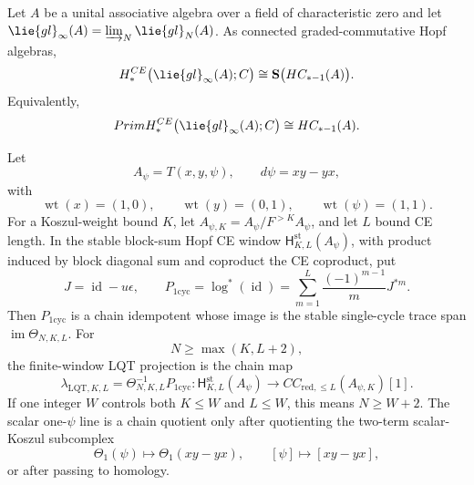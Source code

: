 \documentclass[11pt]{memoir}
\begin{document}
\begin{thm}
  Let \(A\) be a unital associative algebra over a field of characteristic
  zero and let
  \(\lie{gl}_\infty(A)=\varinjlim_N\lie{gl}_N(A)\).  As connected
  graded-commutative Hopf algebras,
  \[
    H_*^{\mathrm{CE}}\bigl(\lie{gl}_{\infty}(A);\C\bigr)
    \cong \mathbf S\bigl(HC_{*-1}(A)\bigr).
  \]
  Equivalently,
  \[
    \operatorname{Prim}H_*^{\mathrm{CE}}
      \bigl(\lie{gl}_\infty(A);\C\bigr)
    \cong HC_{*-1}(A).
  \]
\end{thm}
\begin{thm}\label{thm:stable-eulerian-lqt-window}
  Let
  \[
    A_\psi=T(x,y,\psi),\qquad d\psi=xy-yx,
  \]
  with
  \[
    \operatorname{wt}(x)=(1,0),\qquad
    \operatorname{wt}(y)=(0,1),\qquad
    \operatorname{wt}(\psi)=(1,1).
  \]
  For a Koszul-weight bound \(K\), let
  \(A_{\psi,K}=A_\psi/F^{>K}A_\psi\), and let \(L\) bound CE length.
  In the stable block-sum Hopf CE window
  \(\mathsf H^{\mathrm{st}}_{K,L}(A_\psi)\), with product induced by
  block diagonal sum and coproduct the CE coproduct, put
  \[
    J=\operatorname{id}-u\epsilon,\qquad
    P_{1\mathrm{cyc}}
    =
    \log^*(\operatorname{id})
    =
    \sum_{m=1}^{L}\frac{(-1)^{m-1}}{m}J^{*m}.
  \]
  Then \(P_{1\mathrm{cyc}}\) is a chain idempotent whose image is the
  stable single-cycle trace span
  \(\operatorname{im}\Theta_{N,K,L}\).  For
  \[
    N\geq\max(K,L+2),
  \]
  the finite-window LQT projection is the chain map
  \[
    \lambda_{\mathrm{LQT},K,L}
    =
    \Theta_{N,K,L}^{-1}P_{1\mathrm{cyc}}
    \colon
    \mathsf H^{\mathrm{st}}_{K,L}(A_\psi)
    \longrightarrow
    CC_{\mathrm{red},\leq L}(A_{\psi,K})[1].
  \]
  If one integer \(W\) controls both \(K\leq W\) and \(L\leq W\), this
  means \(N\geq W+2\).  The scalar one-\(\psi\) line is a chain quotient
  only after quotienting the two-term scalar-Koszul subcomplex
  \[
    \Theta_1(\psi)\longmapsto\Theta_1(xy-yx),
    \qquad
    [\psi]\longmapsto[xy-yx],
  \]
  or after passing to homology.
\end{thm}
\end{document}
